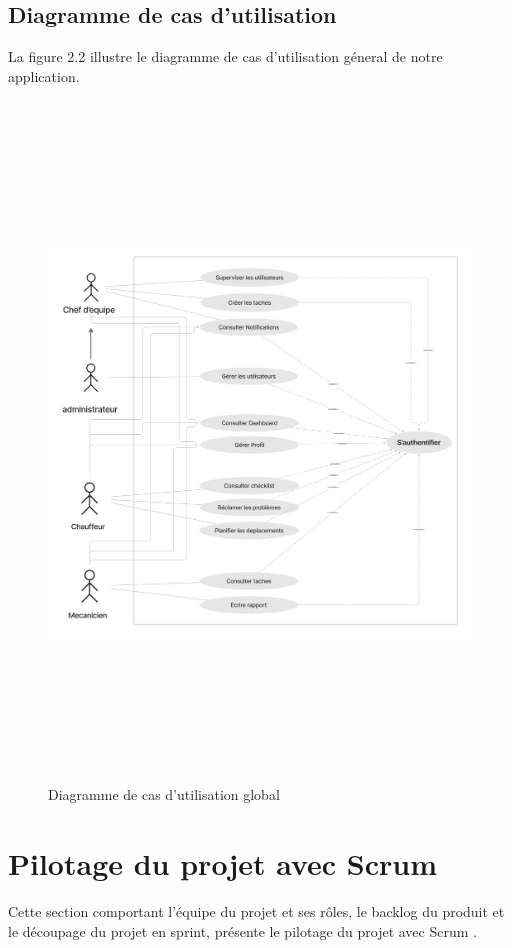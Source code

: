 \subsection{Diagramme de cas d'utilisation}
    La figure 2.2 illustre le diagramme de cas d'utilisation géneral de notre application.
 \begin{figure}[H]
  \centering
  \includegraphics[width=1\textwidth,height=18cm]{chap2.images/use case global.png}
  \caption{Diagramme de cas d'utilisation global}
\end{figure}






\newpage
\section{Pilotage du projet avec Scrum}
Cette section comportant l’équipe du projet et ses rôles, le backlog du produit et le découpage du projet en sprint, présente le pilotage du projet avec Scrum .
